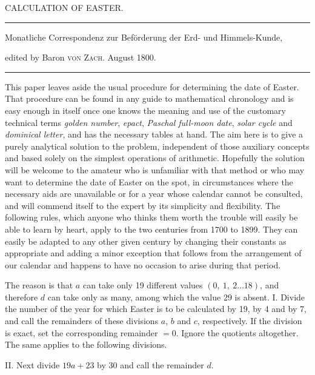 \clearpage
{}
%
\begin{center}
{\large CALCULATION OF EASTER.\par}
\medskip\hrule\medskip
{\small Monatliche Correspondenz zur Beförderung der Erd- und Himmels-Kunde,\par
edited by Baron \textsc{von Zach}. August 1800.\par}
\medskip\hrule
\end{center}
\medskip
This paper leaves aside the usual procedure for determining the date of Easter. That procedure can be found in any guide to mathematical chronology and is easy enough in itself once one knows the meaning and use of the customary technical terms \textit{golden number}, \textit{epact}, \textit{Paschal full-moon date}, \textit{solar cycle} and \textit{dominical letter}, and has the necessary tables at hand. The aim here is to give a purely analytical solution to the problem, independent of those auxiliary concepts and based solely on the simplest operations of arithmetic. Hopefully the solution will be welcome to the amateur who is unfamiliar with that method or who may want to determine the date of Easter on the spot, in circumstances where the necessary aids are unavailable or for a year whose calendar cannot be consulted, and will commend itself to the expert by its simplicity and flexibility. The following rules, which anyone who thinks them worth the trouble will easily be able to learn by heart, apply to the two centuries from 1700 to 1899. They can easily be adapted to any other given century by changing their constants as appropriate and adding a minor exception that follows from the arrangement of our calendar and happens to have no occasion to arise during that period.

%
\expandafter\def\csname HistoricalNoteText2\endcsname{The reason is that $a$ can take only 19 different values $(0,\ 1,\ 2\ldots18)$, and therefore $d$ can take only as many, among which the value 29 is absent.}
I. Divide the number of the year for which Easter is to be calculated by 19, by 4 and by 7, and call the remainders of these divisions $a$, $b$ and $c$, respectively. If the division is exact, set the corresponding remainder $=0$. Ignore the quotients altogether. The same applies to the following divisions.

II. Next divide $19a+23$ by 30 and call the remainder $d$.

